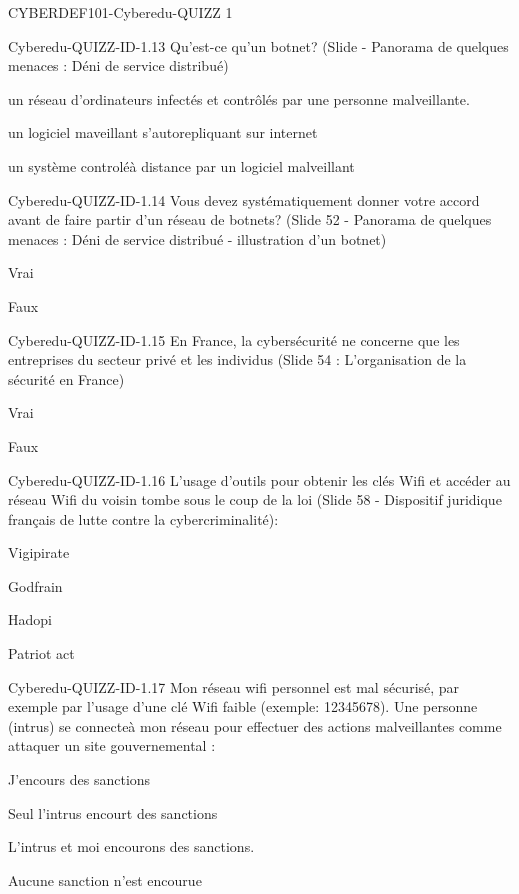 \documentclass[12pt]{article}
\begin{document}
\begin{quiz}{CYBERDEF101-Cyberedu-QUIZZ 1}
\begin{multi}[multiple=true]{Cyberedu-QUIZZ-ID-1.13}
	Qu'est-ce qu'un botnet? (Slide -  Panorama de quelques menaces : D\'eni de service distribu\'e)
\item*  un r\'eseau d'ordinateurs infect\'es et contrôl\'es par une personne malveillante.
\item un logiciel maveillant s'autorepliquant sur internet
\item un système controlé\`a distance par un logiciel malveillant
\end{multi}

\begin{multi}[multiple=true]{Cyberedu-QUIZZ-ID-1.14}
	Vous devez syst\'ematiquement donner votre accord avant de faire partir d'un r\'eseau de botnets? (Slide 52 - Panorama de quelques menaces : D\'eni de service distribu\'e - illustration d'un botnet)
\item 	Vrai
\item* 	Faux
\end{multi}

\begin{multi}[multiple=true]{Cyberedu-QUIZZ-ID-1.15}
	En France, la cybers\'ecurit\'e ne concerne que les entreprises du secteur priv\'e et les individus (Slide 54 : L'organisation de la s\'ecurit\'e en France)
\item 	Vrai
\item* 	Faux
\end{multi}

\begin{multi}[multiple=true]{Cyberedu-QUIZZ-ID-1.16}
	L'usage d'outils pour obtenir les cl\'es Wifi et acc\'eder au r\'eseau  Wifi du voisin tombe sous le coup de la loi (Slide 58 - Dispositif juridique fran\c{c}ais de lutte contre la cybercriminalit\'e):
\item 	Vigipirate
\item* 	Godfrain
\item 	Hadopi
\item 	Patriot act
\end{multi}

\begin{multi}[multiple=true]{Cyberedu-QUIZZ-ID-1.17}
	Mon r\'eseau wifi personnel est mal s\'ecuris\'e, par exemple par l'usage d'une cl\'e Wifi faible (exemple: 12345678). Une personne (intrus) se connecte\`a mon r\'eseau  pour effectuer des actions malveillantes comme attaquer un site gouvernemental :
\item 	J'encours des sanctions
\item 	Seul l'intrus encourt des sanctions
\item* 	L'intrus et moi encourons des sanctions.
\item 	Aucune sanction n'est encourue
\end{multi}


\end{quiz}
\end{document}
